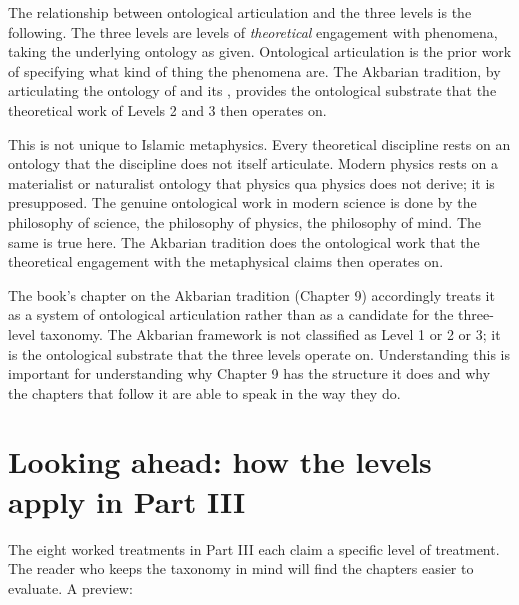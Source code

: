 The relationship between ontological articulation and the three
levels is the following. The three levels are levels of
\emph{theoretical} engagement with phenomena, taking the underlying
ontology as given. Ontological articulation is the prior work of
specifying what kind of thing the phenomena are. The Akbarian
tradition, by articulating the ontology of  and its
, provides the ontological substrate that the
theoretical work of Levels 2 and 3 then operates on.

This is not unique to Islamic metaphysics. Every theoretical
discipline rests on an ontology that the discipline does not itself
articulate. Modern physics rests on a materialist or naturalist
ontology that physics qua physics does not derive; it is presupposed.
The genuine ontological work in modern science is done by the
philosophy of science, the philosophy of physics, the philosophy of
mind. The same is true here. The Akbarian tradition does the
ontological work that the theoretical engagement with the
metaphysical claims then operates on.

The book's chapter on the Akbarian tradition (Chapter 9) accordingly
treats it as a system of ontological articulation rather than as a
candidate for the three-level taxonomy. The Akbarian framework is
not classified as Level 1 or 2 or 3; it is the ontological substrate
that the three levels operate on. Understanding this is important
for understanding why Chapter 9 has the structure it does and why
the chapters that follow it are able to speak in the way they do.

\section{Looking ahead: how the levels apply in Part III}
\label{sec:ahead-2}

The eight worked treatments in Part III each claim a specific level
of treatment. The reader who keeps the taxonomy in mind will find
the chapters easier to evaluate. A preview:

